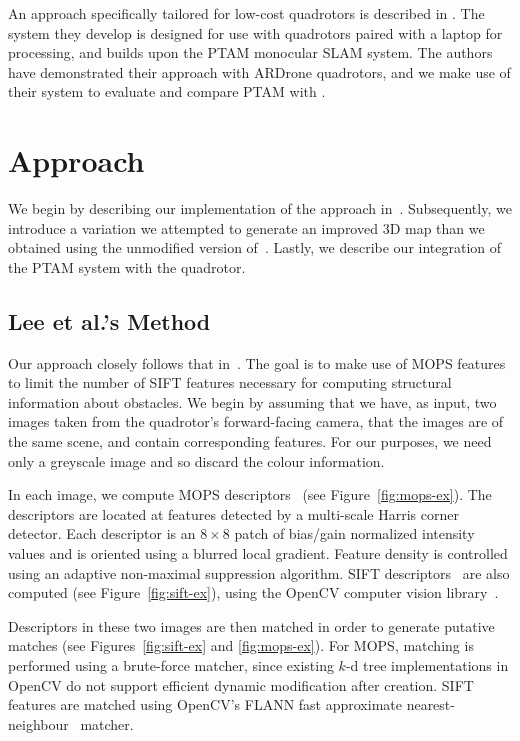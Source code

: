 \documentclass{acmsiggraph}
\begin{document}
An approach specifically tailored for low-cost quadrotors is described in \cite{engel2012a,engel2012b}. The system they develop is designed for use with quadrotors paired with a laptop for processing, and builds upon the PTAM monocular SLAM system. The authors have demonstrated their approach with ARDrone quadrotors, and we make use of their system to evaluate and compare PTAM with \cite{lee2011}.

\section{Approach}
We begin by describing our implementation of the approach in~\cite{lee2011}. Subsequently, we introduce a variation we attempted to generate an improved 3D map than we obtained using the unmodified version of~\cite{lee2011}.  Lastly, we describe our integration of the PTAM system with the quadrotor.

\subsection{Lee et al.'s Method}
Our approach closely follows that in~\cite{lee2011}. The goal is to make use of MOPS features to limit the number of SIFT features necessary for computing structural information about obstacles. We begin by assuming that we have, as input, two images taken from the quadrotor's forward-facing camera, that the images are of the same scene, and contain corresponding features. For our purposes, we need only a greyscale image and so discard the colour information.

In each image, we compute MOPS descriptors~\cite{BSW05} (see Figure~\ref{fig:mops-ex}). The descriptors are located at features detected by a multi-scale Harris corner detector. Each descriptor is an $8 \times 8$ patch of bias/gain normalized intensity values and is oriented using a blurred local gradient. Feature density is controlled using an adaptive non-maximal suppression algorithm. SIFT descriptors~\cite{lowe2004} are also computed (see Figure~\ref{fig:sift-ex}), using the OpenCV computer vision library~\cite{opencv}.

Descriptors in these two images are then matched in order to generate putative matches (see Figures~\ref{fig:sift-ex} and \ref{fig:mops-ex}). For MOPS, matching is performed using a brute-force matcher, since existing $k$-d tree implementations in OpenCV do not support efficient dynamic modification after creation. SIFT features are matched using OpenCV's FLANN fast approximate nearest-neighbour~\cite{flann2009} matcher.
\end{document}
